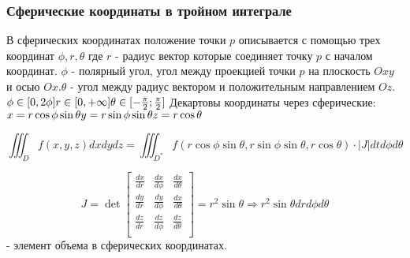 \subsubsection{Сферические координаты в тройном интеграле}
В сферических координатах положение точки $p$ описывается с помощью трех координат $\phi, r, \theta$ где $r $ - радиус вектор которые соединяет точку $p$ с началом координат. $\phi$ - полярный угол, угол между проекцией точки $p$ на плоскость $Oxy$ и осью $Ox. \theta $ - угол между радиус вектором и положительным направлением $Oz$.
$
\\
\phi \in [0, 2\phi] \\ 
r \in [0, +\infty] \\ 
\theta \in [-\frac{\pi}{2}; \frac{\pi}{2}] \\ 
$
Декартовы координаты через сферические:
$
\\
x = r \cos \phi \sin \theta \\ 
y = r \sin \phi \sin \theta  \\ 
z = r \cos \theta  
$

$$
\iiint_D f(x,y,z)dxdydz = \iiint_{D^*} f( r\cos\phi \sin \theta, r \sin \phi \sin \theta, r \cos \theta) \cdot |J| dtd\phi d\theta 
$$

$$
J =  \det \begin{bmatrix}
    \frac{dx}{dr} & \frac{dx}{d\phi} & \frac{dx}{d\theta} \\
    \frac{dy}{dr} & \frac{dy}{d\phi} & \frac{dx}{d\theta} \\
    \frac{dz}{dr} & \frac{dz}{d\phi} & \frac{dz}{d\theta} \\
\end{bmatrix} = r^2 \sin \theta \Rightarrow r^2 \sin \theta dr d\phi d\theta
$$ - элемент объема в сферических координатах.